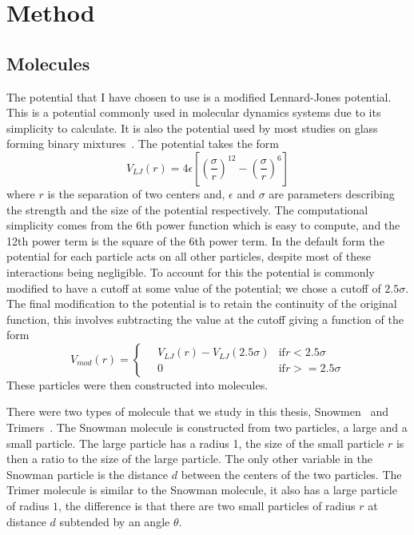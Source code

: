
\chapter{Method}

\section{Molecules}

The potential that I have chosen to use is a modified Lennard-Jones potential. This is a potential commonly used in molecular dynamics systems due to its simplicity to calculate. It is also the potential used by most studies on glass forming binary mixtures~\tocite. The potential takes the form
\begin{equation}
    V_{LJ}(r) = 4\epsilon\left [ \left (\frac{\sigma}{r}\right )^{12} -\left ( \frac{\sigma}{r} \right )^6 \right]
\end{equation}
where $r$ is the separation of two centers and, $\epsilon$ and $\sigma$ are parameters describing the strength and the size of the potential respectively. The computational simplicity comes from the 6th power function which is easy to compute, and the 12th power term is the square of the 6th power term. In the default form the potential for each particle acts on all other particles, despite most of these interactions being negligible. To account for this the potential is commonly modified to have a cutoff at some value of the potential; we chose a cutoff of $2.5\sigma$. The final modification to the potential is to retain the continuity of the original function, this involves subtracting the value at the cutoff giving a function of the form
\begin{equation}
    V_{mod}(r) = \begin{cases}
        \quad V_{LJ}(r) - V_{LJ}(2.5\sigma) & \text{if} r < 2.5\sigma \\
        \quad 0  &\text{if} r >= 2.5\sigma
    \end{cases}
\end{equation}
These particles were then constructed into molecules.

There were two types of molecule that we study in this thesis, Snowmen~ and Trimers~. The Snowman molecule is constructed from two particles, a large and a small particle. The large particle has a radius 1, the size of the small particle $r$ is then a ratio to the size of the large particle. The only other variable in the Snowman particle is the distance $d$ between the centers of the two particles. The Trimer molecule is similar to the Snowman molecule, it also has a large particle of radius $1$, the difference is that there are two small particles of radius $r$ at distance $d$ subtended by an angle $\theta$.

